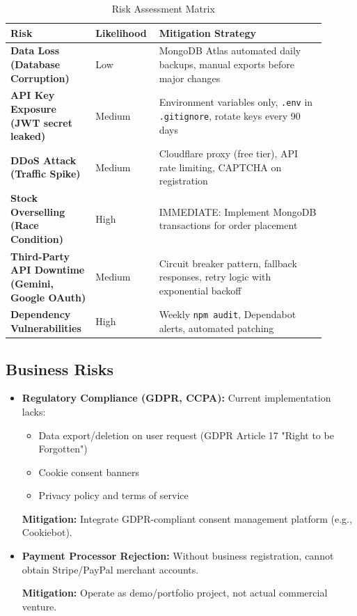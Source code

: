 \documentclass[12pt, a4paper]{report}
\begin{document}
\begin{table}[H]
\centering
\caption{Risk Assessment Matrix}
\label{tab:risk_matrix}
\small
\begin{tabular}{@{}p{0.25\linewidth}p{0.15\linewidth}p{0.50\linewidth}@{}}
\toprule
\textbf{Risk} & \textbf{Likelihood} & \textbf{Mitigation Strategy} \\
\midrule
\textbf{Data Loss (Database Corruption)} & Low & MongoDB Atlas automated daily backups, manual exports before major changes \\
\textbf{API Key Exposure (JWT secret leaked)} & Medium & Environment variables only, \texttt{.env} in \texttt{.gitignore}, rotate keys every 90 days \\
\textbf{DDoS Attack (Traffic Spike)} & Medium & Cloudflare proxy (free tier), API rate limiting, CAPTCHA on registration \\
\textbf{Stock Overselling (Race Condition)} & High & IMMEDIATE: Implement MongoDB transactions for order placement \\
\textbf{Third-Party API Downtime (Gemini, Google OAuth)} & Medium & Circuit breaker pattern, fallback responses, retry logic with exponential backoff \\
\textbf{Dependency Vulnerabilities} & High & Weekly \texttt{npm audit}, Dependabot alerts, automated patching \\
\bottomrule
\end{tabular}
\end{table}

\subsection{Business Risks}

\begin{itemize}
    \item \textbf{Regulatory Compliance (GDPR, CCPA):} Current implementation lacks:
    \begin{itemize}
        \item Data export/deletion on user request (GDPR Article 17 "Right to be Forgotten")
        \item Cookie consent banners
        \item Privacy policy and terms of service
    \end{itemize}
    
    \textbf{Mitigation:} Integrate GDPR-compliant consent management platform (e.g., Cookiebot).
    
    \item \textbf{Payment Processor Rejection:} Without business registration, cannot obtain Stripe/PayPal merchant accounts.
    
    \textbf{Mitigation:} Operate as demo/portfolio project, not actual commercial venture.
\end{itemize}
\end{document}
